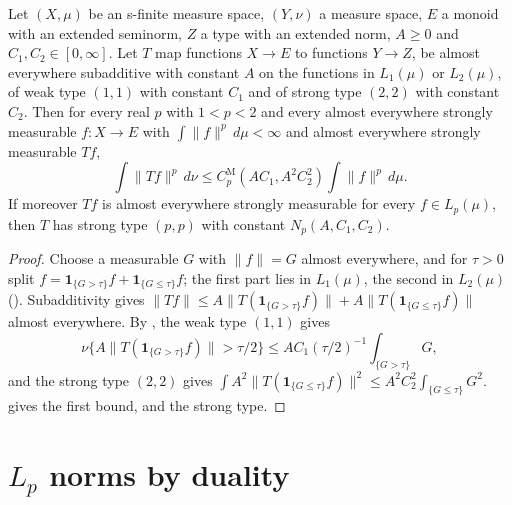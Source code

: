 \begin{theorem}
\label{thm:marcinkiewicz-interpolation}
\leanok
{}
Let $(X, \mu)$ be an s-finite measure space, $(Y, \nu)$ a measure space, $E$ a monoid with an
extended seminorm, $Z$ a type with an extended norm, $A \geq 0$ and
$C_1, C_2 \in [0, \infty]$. Let $T$ map functions $X \to E$ to functions $Y \to Z$, be almost
everywhere subadditive with constant $A$ on the functions in $L_1(\mu)$ or $L_2(\mu)$, of weak
type $(1, 1)$ with constant $C_1$ and of strong type $(2, 2)$ with constant $C_2$. Then for every
real $p$ with $1 < p < 2$ and every almost everywhere strongly measurable $f : X \to E$ with
$\int \|f\|^p \, d\mu < \infty$ and almost everywhere strongly measurable $T f$,
\[
  \int \|T f\|^p \, d\nu \leq C^{\mathrm M}_p(A C_1, A^2 C_2^2) \int \|f\|^p \, d\mu .
\]
If moreover $T f$ is almost everywhere strongly measurable for every $f \in L_p(\mu)$, then $T$
has strong type $(p, p)$ with constant $N_p(A, C_1, C_2)$.
\end{theorem}

\begin{proof}
\leanok
Choose a measurable $G$ with $\|f\| = G$ almost everywhere, and for $\tau > 0$ split
$f = \mathbf 1_{\{G > \tau\}} f + \mathbf 1_{\{G \leq \tau\}} f$; the first part lies in
$L_1(\mu)$, the second in $L_2(\mu)$ (). Subadditivity gives
$\|T f\| \leq A \|T(\mathbf 1_{\{G > \tau\}} f)\| + A \|T(\mathbf 1_{\{G \leq \tau\}} f)\|$
almost everywhere. By , the weak type $(1,1)$ gives
\[
  \nu\{A \|T(\mathbf 1_{\{G > \tau\}} f)\| > \tau/2\}
  \leq A C_1 (\tau/2)^{-1} \int_{\{G > \tau\}} G ,
\]
and the strong type $(2,2)$ gives
$\int A^2 \|T(\mathbf 1_{\{G \leq \tau\}} f)\|^2 \leq A^2 C_2^2 \int_{\{G \leq \tau\}} G^2$.
 gives the first bound, and
 the strong type.
\end{proof}

\section{\texorpdfstring{$L_p$}{L\_p} norms by duality}
\label{sec:lp-norm-duality}

